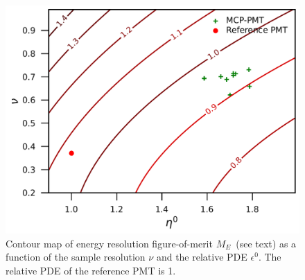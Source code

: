 \begin{figure}[!htbp]
    \centering
    \includegraphics[width=\MF\textwidth]{figures/result/resolution.pdf}
    \caption{Contour map of energy resolution figure-of-merit $M_{E}$~(see text) as a function of the sample resolution $\nu$ and the relative PDE $\epsilon^0$. The relative PDE of the reference PMT is 1.}
    \label{fig:EnergyResolution}
\end{figure}

